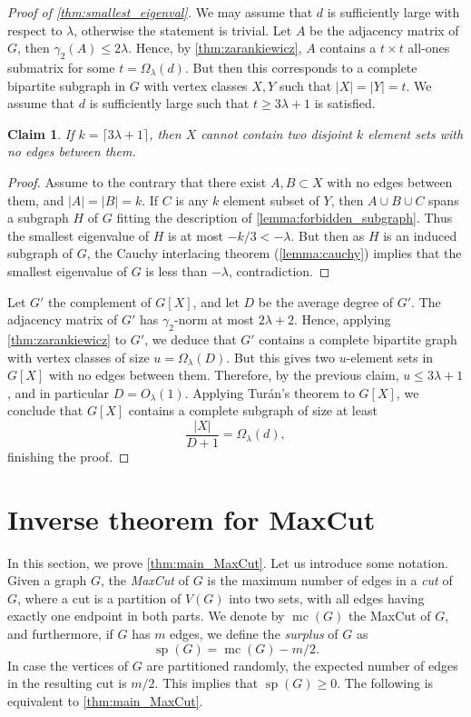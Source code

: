 \documentclass[11pt]{amsart}
\theoremstyle{plain}
\newtheorem{claim}[theorem]{Claim}
\theoremstyle{definition}
\DeclareMathOperator{\surp}{sp}
\DeclareMathOperator{\mc}{mc}
\begin{document}
\begin{proof}[Proof of  \cref{thm:smallest_eigenval}]
We may assume that $d$ is sufficiently large with respect to $\lambda$, otherwise the statement is trivial. Let $A$ be the adjacency matrix of $G$, then $\gamma_2(A)\leq 2\lambda$. Hence, by  \cref{thm:zarankiewicz}, $A$ contains a $t\times t$ all-ones submatrix for some $t=\Omega_{\lambda}(d)$. But then this corresponds to a complete bipartite subgraph in $G$ with vertex classes $X,Y$ such that $|X|=|Y|=t$. We assume that $d$ is sufficiently large such that $t\geq 3\lambda+1$ is satisfied. 

\begin{claim}
   If $k=\lceil3\lambda+1\rceil$, then $X$ cannot contain two disjoint $k$ element sets with no edges between them.
\end{claim}

\begin{proof}
    Assume to the contrary that there exist $A,B\subset X$ with no edges between them, and $|A|=|B|=k$. If $C$ is any $k$ element subset of $Y$, then $A\cup B\cup C$ spans a subgraph $H$ of $G$ fitting the  description of \cref{lemma:forbidden_subgraph}. Thus the smallest eigenvalue of $H$ is at most $-k/3< -\lambda$. But then as $H$ is an induced subgraph of $G$, the Cauchy interlacing theorem (\cref{lemma:cauchy}) implies that the smallest eigenvalue of $G$ is less than $-\lambda$, contradiction.
\end{proof}
Let $G'$ the complement of $G[X]$, and let $D$ be the average degree of $G'$. The adjacency matrix of $G'$ has $\gamma_2$-norm at most $2\lambda+2$. Hence, applying \cref{thm:zarankiewicz} to $G'$, we deduce that $G'$ contains a complete bipartite graph with vertex classes of size $u=\Omega_{\lambda}(D)$. But this gives two $u$-element sets in $G[X]$ with no edges between them. Therefore, by the previous claim, $u\leq 3\lambda+1$, and in particular $D=O_{\lambda}(1)$. Applying Tur\'an's theorem to $G[X]$, we conclude that $G[X]$ contains a complete subgraph of size at least
$$\frac{|X|}{D+1}=\Omega_{\lambda}(d),$$
finishing the proof.
\end{proof}


\section{Inverse theorem for MaxCut}\label{sect:maxcut}

In this section, we prove  \cref{thm:main_MaxCut}. Let us introduce some notation. Given a graph $G$, the \emph{MaxCut} of $G$ is the maximum number of edges in a \emph{cut} of $G$, where a cut is a partition of $V(G)$ into two sets, with all edges having exactly one endpoint in both parts. We denote by $\mc(G)$ the MaxCut of $G$, and furthermore, if $G$ has $m$ edges, we define the \emph{surplus} of $G$ as 
$$\surp(G)=\mc(G)-m/2.$$
In case the vertices of $G$ are partitioned randomly, the expected number of edges in the resulting cut is $m/2$. This implies that $\surp(G)\geq 0$. The following is equivalent to  \cref{thm:main_MaxCut}. 
\end{document}
